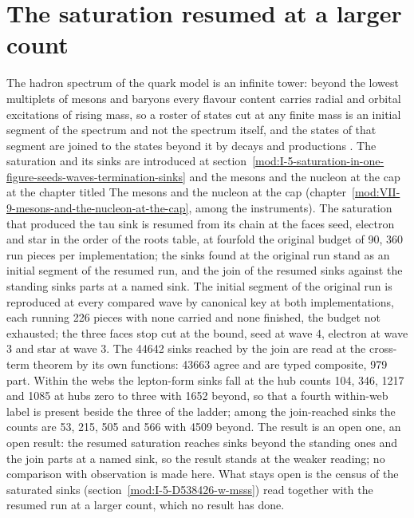 \section{The saturation resumed at a larger count}\label{mod:I-5-D539599-w-audt}
The hadron spectrum of the quark model is an infinite tower: beyond the lowest multiplets of mesons and baryons every flavour content carries radial and orbital excitations of rising mass, so a roster of states cut at any finite mass is an initial segment of the spectrum and not the spectrum itself, and the states of that segment are joined to the states beyond it by decays and productions \cite{GellMann1964,Griffiths2008}. The saturation and its sinks are introduced at section~\ref{mod:I-5-saturation-in-one-figure-seeds-waves-termination-sinks} and the mesons and the nucleon at the cap at the chapter titled The mesons and the nucleon at the cap (chapter~\ref{mod:VII-9-mesons-and-the-nucleon-at-the-cap}, among the instruments).
The saturation that produced the tau sink is resumed from its chain at the faces seed, electron and star in the order of the roots table, at fourfold the original budget of 90, 360 run pieces per implementation; the sinks found at the original run stand as an initial segment of the resumed run, and the join of the resumed sinks against the standing sinks parts at a named sink.
The initial segment of the original run is reproduced at every compared wave by canonical key at both implementations, each running 226 pieces with none carried and none finished, the budget not exhausted; the three faces stop cut at the bound, seed at wave 4, electron at wave 3 and star at wave 3. The 44642 sinks reached by the join are read at the cross-term theorem by its own functions: 43663 agree and are typed composite, 979 part. Within the webs the lepton-form sinks fall at the hub counts 104, 346, 1217 and 1085 at hubs zero to three with 1652 beyond, so that a fourth within-web label is present beside the three of the ladder; among the join-reached sinks the counts are 53, 215, 505 and 566 with 4509 beyond.
The result is an open one, an open result: the resumed saturation reaches sinks beyond the standing ones and the join parts at a named sink, so the result stands at the weaker reading; no comparison with observation is made here.
What stays open is the census of the saturated sinks (section~\ref{mod:I-5-D538426-w-msss}) read together with the resumed run at a larger count, which no result has done.
